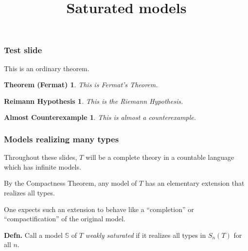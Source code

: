 \documentclass[t,xcolor=dvipsnames,handout]{beamer}
\title{Saturated models}
\date[]{}
\theoremstyle{theoremFermat}
\newtheorem{theoremFermat}[theorem]{Theorem (Fermat)}
\theoremstyle{reimann}
\newtheorem{reimann}[theorem]{Reimann Hypothesis}
\theoremstyle{ACExample}
\newtheorem{ACExample}[theorem]{Almost Counterexample}
\begin{document}




\beamerdefaultoverlayspecification{<+->}

\begin{frame}
  \titlepage
\end{frame}

\begin{frame} 
  \frametitle{Test slide}

\begin{theorem}
This is an ordinary theorem.
\end{theorem}

\begin{theoremFermat}
This is Fermat's Theorem.
\end{theoremFermat}

\begin{reimann}
This is the Riemann Hypothesis.
\end{reimann}

\begin{ACExample}
This is almost a counterexample.
\end{ACExample}

\end{frame}


\begin{frame} 
  \frametitle{Models realizing many types}

\pause
Throughout these slides, $T$ will be a complete theory
in a countable language which has infinite models.

\bigskip
\pause
By the Compactness Theorem, any model
of $T$ has an elementary extension that realizes all types.

\bigskip
\pause
One expects such an extension to behave like a
``completion'' or ``compactification''
of the original model.

\bigskip
\pause
    {\bf Defn.} Call a model $\mathbb S$ of $T$
\emph{weakly saturated}
if it realizes all types in $S_n(T)$ for all $n$.

\end{frame}
\end{document}
